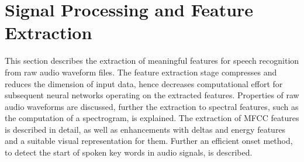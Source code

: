 
\chapter{Signal Processing and Feature Extraction}\label{sec:signal}
This section describes the extraction of meaningful features for speech recognition from raw audio waveform files.
The feature extraction stage compresses and reduces the dimension of input data, hence decreases computational effort for subsequent neural networks operating on the extracted features.
Properties of raw audio waveforms are discussed, further the extraction to spectral features, such as the computation of a spectrogram, is explained. 
The extraction of MFCC features is described in detail, as well as enhancements with deltas and energy features and a suitable visual representation for them.
Further an efficient onset method, to detect the start of spoken key words in audio signals, is described.





